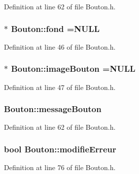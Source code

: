 Definition at line 62 of file Bouton.\+h.

\hypertarget{class_bouton_aa53b44d614e81eea3e1d93ac95099475}{}
\subsubsection[{fond}]{$\ast$ Bouton\+::fond ={\bf N\+U\+L\+L}}\label{class_bouton_aa53b44d614e81eea3e1d93ac95099475}


Definition at line 46 of file Bouton.\+h.

\hypertarget{class_bouton_a500913a4699d8a5e650861552efd1365}{}
\subsubsection[{image\+Bouton}]{$\ast$ Bouton\+::image\+Bouton ={\bf N\+U\+L\+L}}\label{class_bouton_a500913a4699d8a5e650861552efd1365}


Definition at line 47 of file Bouton.\+h.

\hypertarget{class_bouton_a545af4baad4f8926bbec4ede6cefb840}{}
\subsubsection[{message\+Bouton}]{ Bouton\+::message\+Bouton}\label{class_bouton_a545af4baad4f8926bbec4ede6cefb840}


Definition at line 62 of file Bouton.\+h.

\hypertarget{class_bouton_ad7f56d85125a4b1565969a68ce8f0823}{}
\subsubsection[{modifie\+Erreur}]{\setlength{\rightskip}{0pt plus 5cm}bool Bouton\+::modifie\+Erreur}\label{class_bouton_ad7f56d85125a4b1565969a68ce8f0823}


Definition at line 76 of file Bouton.\+h.

\hypertarget{class_bouton_a96ebc0ef1ca73c65048e3d52293f6ad3}{}
